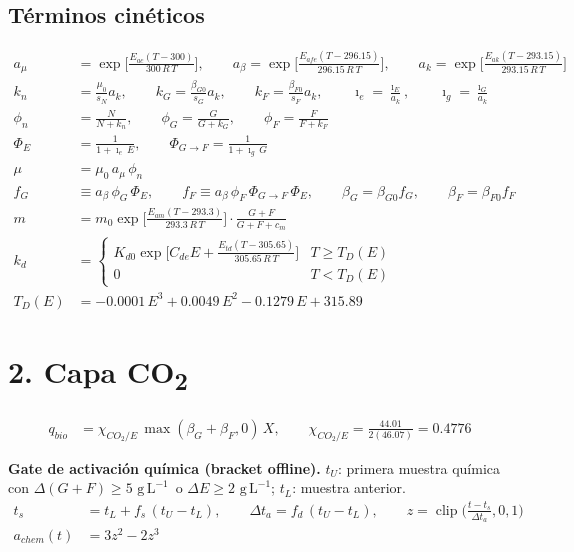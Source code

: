 \documentclass[11pt,a4paper]{article}
\newcommand{\gL}{\ensuremath{\mathrm{g\,L^{-1}}}}
\begin{document}
\subsection*{Términos cinéticos}
\begin{align}
a_\mu &= \exp\!\Big[\tfrac{E_{ac}(T-300)}{300\,R\,T}\Big], \qquad
a_\beta = \exp\!\Big[\tfrac{E_{afe}(T-296.15)}{296.15\,R\,T}\Big], \qquad
a_k = \exp\!\Big[\tfrac{E_{ak}(T-293.15)}{293.15\,R\,T}\Big] \tag{U8}\\
k_n &= \frac{\mu_0}{s_N}a_k, \qquad
k_G = \frac{\beta_{G0}}{s_G}a_k, \qquad
k_F = \frac{\beta_{F0}}{s_F}a_k, \qquad
\imath_e = \frac{\imath_E}{a_k}, \qquad
\imath_g = \frac{\imath_G}{a_k} \tag{U9}\\
\phi_n &= \frac{N}{N+k_n}, \qquad
\phi_G = \frac{G}{G+k_G}, \qquad
\phi_F = \frac{F}{F+k_F} \tag{U10}\\
\Phi_E &= \frac{1}{1+\imath_e\,E}, \qquad
\Phi_{G\to F} = \frac{1}{1+\imath_g\,G} \tag{U11}\\
\mu &= \mu_0\,a_\mu\,\phi_n \tag{U12}\\
f_G &\equiv a_\beta\,\phi_G\,\Phi_E, \qquad
f_F \equiv a_\beta\,\phi_F\,\Phi_{G\to F}\,\Phi_E, \qquad
\beta_G = \beta_{G0}f_G, \qquad
\beta_F = \beta_{F0}f_F \tag{U13}\\
m &= m_0\exp\!\Big[\tfrac{E_{am}(T-293.3)}{293.3\,R\,T}\Big]\cdot\frac{G+F}{G+F+c_m} \tag{U14}\\
k_d &= \begin{cases}
K_{d0}\exp\!\Big[C_{de}E+\tfrac{E_{td}(T-305.65)}{305.65\,R\,T}\Big] & T\ge T_D(E)\\
0 & T<T_D(E)
\end{cases} \tag{U15}\\
T_D(E) &= -0.0001\,E^3+0.0049\,E^2-0.1279\,E+315.89 \tag{U16}
\end{align}

\section*{2. Capa CO\textsubscript{2}}

\begin{align}
q_{bio} &= \chi_{CO_2/E}\,\max(\beta_G+\beta_F,0)\,X, \qquad
\chi_{CO_2/E}=\frac{44.01}{2(46.07)}=0.4776 \tag{C1}
\end{align}

\textbf{Gate de activación química (bracket offline).} $t_U$: primera muestra química con
$\Delta(G+F)\ge 5$ \gL~o $\Delta E\ge 2$ \gL; $t_L$: muestra anterior.
\begin{align}
t_s &= t_L + f_s\,(t_U-t_L), \qquad
\Delta t_a = f_d\,(t_U-t_L), \qquad
z = \operatorname{clip}\!\Big(\frac{t-t_s}{\Delta t_a},0,1\Big) \tag{C2}\\
a_{chem}(t) &= 3z^2-2z^3 \tag{C3}
\end{align}
\end{document}
